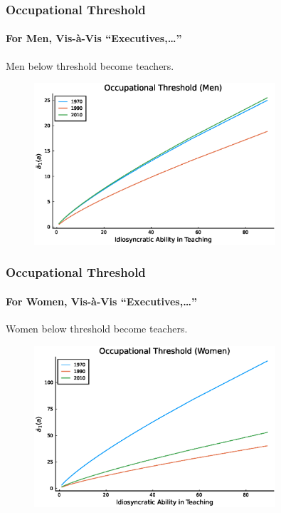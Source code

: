 \documentclass[11pt]{beamer}
\begin{document}
\begin{frame}
\frametitle{Occupational Threshold}
\framesubtitle{For Men, Vis-\`a-Vis ``Executives,\ldots''}
Men below threshold become teachers.
\begin{figure}
 \begin{center}
\includegraphics[width=0.8\textwidth]{plots/a_O_men.eps}
 			\label{ }
 		\end{center}
 	\end{figure}
\end{frame}

\begin{frame}
\frametitle{Occupational Threshold}
\framesubtitle{For Women, Vis-\`a-Vis ``Executives,\ldots''}
Women below threshold become teachers.
\begin{figure}
 \begin{center}
\includegraphics[width=0.8\textwidth]{plots/a_O_women.eps}
 			\label{ }
 		\end{center}
 	\end{figure}
\end{frame}
\end{document}
